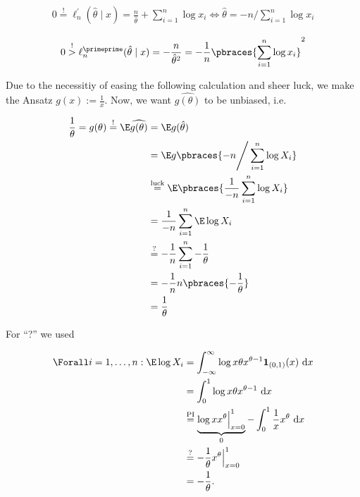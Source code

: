 \begin{solution}
\begin{align*}
    0
    \stackrel{!}{=}
    \ell_n^\prime(\hat \theta \mid x)
    =
    \frac{n}{\hat \theta} + \sum_{i=1}^n \log x_i
    \iff
    \hat \theta = -n \Bigg / \sum_{i=1}^n \log x_i
\end{align*}

\begin{align*}
    0
    \stackrel{!}{>}
    \ell_n^\primeprime(\hat \theta \mid x)
    =
    -\frac{n}{\hat \theta^2}
    =
    -\frac{1}{n}
    \pbraces
    {
        \sum_{i=1}^n \log x_i
    }^2
\end{align*}

Due to the necessitiy of easing the following calculation and sheer luck, we make the Ansatz $g(x) := \frac{1}{x}$.
Now, we want $\widehat{g(\theta)}$ to be unbiased, i.e.

\begin{align*}
    \frac{1}{\theta}
    =
    g(\theta)
    \stackrel{!}{=}
    \E \widehat{g(\theta)}
    & =
    \E g(\hat \theta) \\
    & =
    \E g \pbraces{-n \Bigg / \sum_{i=1}^n \log X_i} \\
    & \stackrel
    {
        \text{luck}
    }{=}
    \E \pbraces{\frac{1}{-n} \sum_{i=1}^n \log X_i} \\
    & =
    \frac{1}{-n} \sum_{i=1}^n \E \log X_i \\
    & \stackrel{?}{=}
    -\frac{1}{n} \sum_{i=1}^n -\frac{1}{\theta} \\
    & =
    -\frac{1}{n} n \pbraces{-\frac{1}{\theta}} \\
    & =
    \frac{1}{\theta}
\end{align*}

For \enquote ? we used

\begin{align*}
    \Forall i = 1, \dots, n:
        \E \log X_i
        & =
        \int_{-\infty}^\infty
            \log x \theta x^{\theta - 1} \mathbf 1_{(0, 1)}(x)
            ~ \mathrm d x \\
        & =
        \int_0^1
            \log x \theta x^{\theta - 1}
            ~ \mathrm d x \\
        & \stackrel
        {
            \text{PI}
        }{=}
        \underbrace
        {
            \log x x^\theta \Big |_{x=0}^1
        }_0
        -
        \int_0^1
            \frac{1}{x} x^\theta
            ~ \mathrm d x \\
        & \stackrel{?}{=}
        -\frac{1}{\theta} x^\theta \Big |_{x=0}^1 \\
        & =
        -\frac{1}{\theta}.
\end{align*}


\end{solution}
